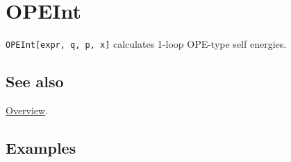 \documentclass[../FeynCalcManual.tex]{subfiles}
\begin{document}
\hypertarget{opeint}{
\section{OPEInt}\label{opeint}}

\texttt{OPEInt[\allowbreak{}expr,\ \allowbreak{}q,\ \allowbreak{}p,\ \allowbreak{}x]}
calculates 1-loop OPE-type self energies.

\subsection{See also}

\hyperlink{toc}{Overview}.

\subsection{Examples}
\end{document}
